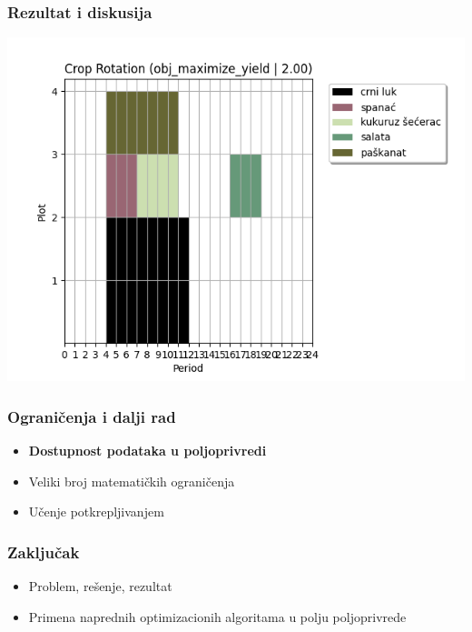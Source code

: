 \documentclass{beamer}
\begin{document}
\begin{frame}
  \frametitle{Rezultat i diskusija}
  \includegraphics[height=0.85\textheight]{slike/yield.png}
\end{frame}

\begin{frame}
  \frametitle{Ograničenja i dalji rad}

  \begin{itemize}
  \item{\textbf{Dostupnost podataka u poljoprivredi}}
  \item{Veliki broj matematičkih ograničenja}
  \item{Učenje potkrepljivanjem}
  \end{itemize}
\end{frame}

\begin{frame}
  \frametitle{Zaključak}

  \begin{itemize}
  \item{Problem, rešenje, rezultat}
  \item{Primena naprednih optimizacionih algoritama u polju poljoprivrede}
  \end{itemize}
\end{frame}
\end{document}
